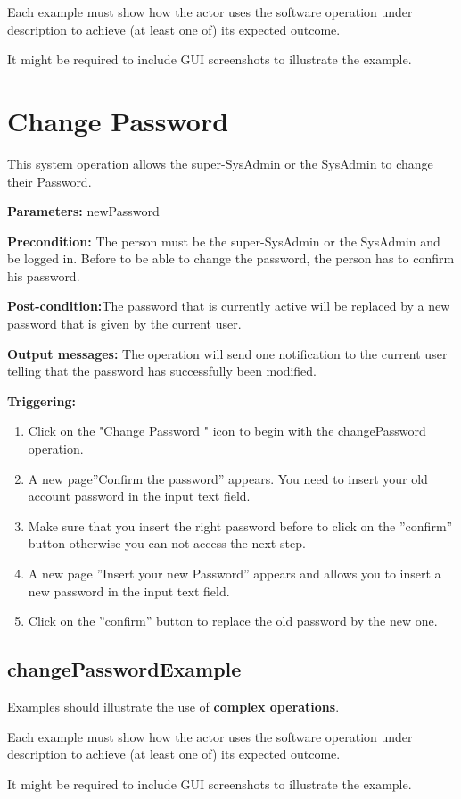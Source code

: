 Each example must show how the actor uses the software operation under
description to achieve (at least one of) its expected outcome.

It might be required to include GUI screenshots to illustrate the example.



\section{Change Password}
\label{operation:changePassword}
This system operation allows the super-SysAdmin or the SysAdmin to change
their Password.

\begin{description}

\item \textbf{Parameters:} newPassword
\item \textbf{Precondition:} The person must be the super-SysAdmin or the
SysAdmin and be logged in. Before to be able to change the password, the person has to confirm his password.
\item \textbf{Post-condition:}The password that is currently active will be
replaced by a new password that is given by the current user.
\item \textbf{Output messages:} The operation will send one notification to the
current user telling that the password  has successfully been modified.


\item \textbf{Triggering:}
\begin{enumerate}
\item Click on the "Change Password " icon to begin with the changePassword
operation.
\item A new page''Confirm the password'' appears. You need to insert your old
account password in the input text field. 
\item Make sure that you insert the right password before to click on the
''confirm'' button otherwise you can not access the next step.
\item A new page ''Insert your new Password'' appears and allows you to
insert a new password in the input text field.
\item Click on the ''confirm'' button to replace the old password by the new
one.

\end{enumerate}

 
\end{description}

 
\subsection{changePasswordExample}
Examples should illustrate the use of \textbf{complex operations}.

Each example must show how the actor uses the software operation under
description to achieve (at least one of) its expected outcome.

It might be required to include GUI screenshots to illustrate the example.




